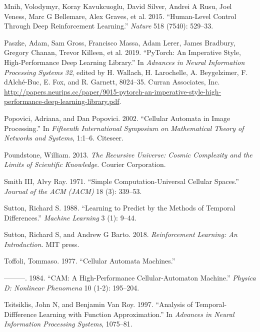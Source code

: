 \documentclass[
  openany]{book}
\newlength{\cslhangindent}
\newenvironment{cslreferences}%
  {\setlength{\parindent}{0pt}%
  \everypar{\setlength{\hangindent}{\cslhangindent}}\ignorespaces}%
  {\par}
\begin{document}
\begin{cslreferences}
\leavevmode\hypertarget{ref-mnih2015human}{}%
Mnih, Volodymyr, Koray Kavukcuoglu, David Silver, Andrei A Rusu, Joel Veness, Marc G Bellemare, Alex Graves, et al. 2015. ``Human-Level Control Through Deep Reinforcement Learning.'' \emph{Nature} 518 (7540): 529--33.

\leavevmode\hypertarget{ref-NEURIPS2019_9015}{}%
Paszke, Adam, Sam Gross, Francisco Massa, Adam Lerer, James Bradbury, Gregory Chanan, Trevor Killeen, et al. 2019. ``PyTorch: An Imperative Style, High-Performance Deep Learning Library.'' In \emph{Advances in Neural Information Processing Systems 32}, edited by H. Wallach, H. Larochelle, A. Beygelzimer, F. d\textquotesingle Alché-Buc, E. Fox, and R. Garnett, 8024--35. Curran Associates, Inc. \url{http://papers.neurips.cc/paper/9015-pytorch-an-imperative-style-high-performance-deep-learning-library.pdf}.

\leavevmode\hypertarget{ref-popovici2002cellular}{}%
Popovici, Adriana, and Dan Popovici. 2002. ``Cellular Automata in Image Processing.'' In \emph{Fifteenth International Symposium on Mathematical Theory of Networks and Systems}, 1:1--6. Citeseer.

\leavevmode\hypertarget{ref-poundstone2013recursive}{}%
Poundstone, William. 2013. \emph{The Recursive Universe: Cosmic Complexity and the Limits of Scientific Knowledge}. Courier Corporation.

\leavevmode\hypertarget{ref-smith1971simple}{}%
Smith III, Alvy Ray. 1971. ``Simple Computation-Universal Cellular Spaces.'' \emph{Journal of the ACM (JACM)} 18 (3): 339--53.

\leavevmode\hypertarget{ref-sutton1988learning}{}%
Sutton, Richard S. 1988. ``Learning to Predict by the Methods of Temporal Differences.'' \emph{Machine Learning} 3 (1): 9--44.

\leavevmode\hypertarget{ref-sutton2018reinforcement}{}%
Sutton, Richard S, and Andrew G Barto. 2018. \emph{Reinforcement Learning: An Introduction}. MIT press.

\leavevmode\hypertarget{ref-toffoli1977cellular}{}%
Toffoli, Tommaso. 1977. ``Cellular Automata Machines.''

\leavevmode\hypertarget{ref-toffoli1984cam}{}%
---------. 1984. ``CAM: A High-Performance Cellular-Automaton Machine.'' \emph{Physica D: Nonlinear Phenomena} 10 (1-2): 195--204.

\leavevmode\hypertarget{ref-tsitsiklis1997analysis}{}%
Tsitsiklis, John N, and Benjamin Van Roy. 1997. ``Analysis of Temporal-Diffference Learning with Function Approximation.'' In \emph{Advances in Neural Information Processing Systems}, 1075--81.


\end{cslreferences}
\end{document}
